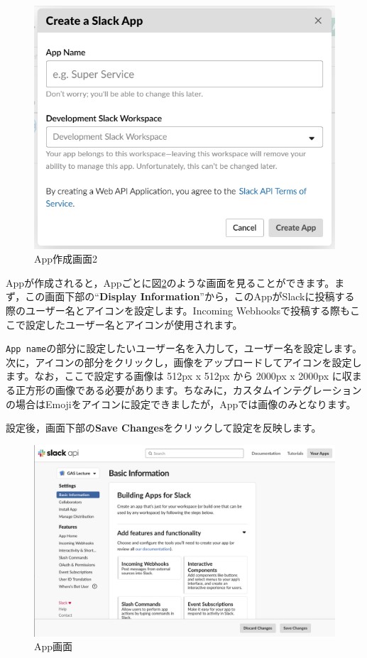 \documentclass[uplatex,a4j]{jsarticle}
\begin{document}
\begin{figure}[H]
 \centering
 \includegraphics[keepaspectratio, scale=0.55]{images/create_new_app2.png}
 \caption{App作成画面2}
 \label{fig:create_new_app2}
\end{figure}

Appが作成されると，Appごとに図\ref{fig:create_new_app3}のような画面を見ることができます。まず，この画面下部の``\textbf{Display Information}''から，このAppがSlackに投稿する際のユーザー名とアイコンを設定します。Incoming Webhooksで投稿する際もここで設定したユーザー名とアイコンが使用されます。

\verb|App name|の部分に設定したいユーザー名を入力して，ユーザー名を設定します。\\
次に，アイコンの部分をクリックし，画像をアップロードしてアイコンを設定します。なお，ここで設定する画像は 512px x 512px から 2000px x 2000px に収まる正方形の画像である必要があります。ちなみに，カスタムインテグレーションの場合はEmojiをアイコンに設定できましたが，Appでは画像のみとなります。


設定後，画面下部の\textbf{Save Changes}をクリックして設定を反映します。

\begin{figure}[H]
 \centering
 \includegraphics[keepaspectratio, scale=0.4]{images/create_new_app3.png}
 \caption{App画面}
 \label{fig:create_new_app3}
\end{figure}
\end{document}
